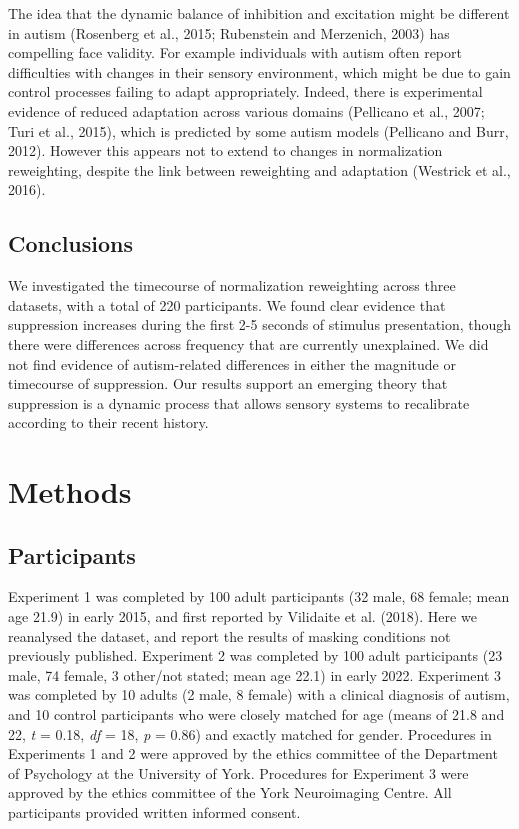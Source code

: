 \documentclass[
]{article}
\begin{document}
The idea that the dynamic balance of inhibition and excitation might be different in autism (Rosenberg et al., 2015; Rubenstein and Merzenich, 2003) has compelling face validity. For example individuals with autism often report difficulties with changes in their sensory environment, which might be due to gain control processes failing to adapt appropriately. Indeed, there is experimental evidence of reduced adaptation across various domains (Pellicano et al., 2007; Turi et al., 2015), which is predicted by some autism models (Pellicano and Burr, 2012). However this appears not to extend to changes in normalization reweighting, despite the link between reweighting and adaptation (Westrick et al., 2016).

\hypertarget{conclusions}{%
\subsection{Conclusions}\label{conclusions}}

We investigated the timecourse of normalization reweighting across three datasets, with a total of 220 participants. We found clear evidence that suppression increases during the first 2-5 seconds of stimulus presentation, though there were differences across frequency that are currently unexplained. We did not find evidence of autism-related differences in either the magnitude or timecourse of suppression. Our results support an emerging theory that suppression is a dynamic process that allows sensory systems to recalibrate according to their recent history.

\hypertarget{methods}{%
\section{Methods}\label{methods}}

\hypertarget{participants}{%
\subsection{Participants}\label{participants}}

Experiment 1 was completed by 100 adult participants (32 male, 68 female; mean age 21.9) in early 2015, and first reported by Vilidaite et al. (2018). Here we reanalysed the dataset, and report the results of masking conditions not previously published. Experiment 2 was completed by 100 adult participants (23 male, 74 female, 3 other/not stated; mean age 22.1) in early 2022. Experiment 3 was completed by 10 adults (2 male, 8 female) with a clinical diagnosis of autism, and 10 control participants who were closely matched for age (means of 21.8 and 22, \emph{t} = 0.18, \emph{df} = 18, \emph{p} = 0.86) and exactly matched for gender. Procedures in Experiments 1 and 2 were approved by the ethics committee of the Department of Psychology at the University of York. Procedures for Experiment 3 were approved by the ethics committee of the York Neuroimaging Centre. All participants provided written informed consent.
\end{document}
